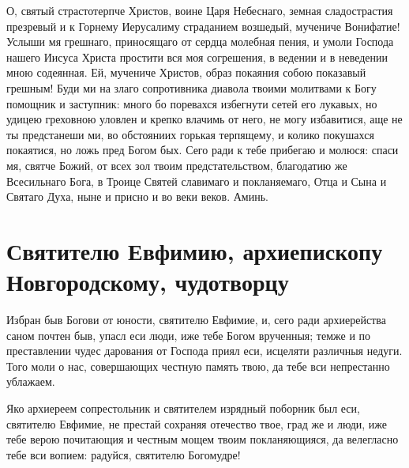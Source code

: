 О, святый страстотерпче Христов, воине Царя Небеснаго, земная сладострастия презревый и к Горнему Иерусалиму страданием возшедый, мучениче Вонифатие! Услыши мя грешнаго, приносящаго от сердца молебная пения, и умоли Господа нашего Иисуса Христа простити вся моя согрешения, в ведении и в неведении мною содеянная. Ей, мучениче Христов, образ покаяния собою показавый грешным! Буди ми на злаго сопротивника диавола твоими молитвами к Богу помощник и заступник: много бо поревахся избегнути сетей его лукавых, но удицею греховною уловлен и крепко влачимь от него, не могу избавитися, аще не ты предстанеши ми, во обстояниих горькая терпящему, и колико покушахся покаятися, но ложь пред Богом бых. Сего ради к тебе прибегаю и молюся: спаси мя, святче Божий, от всех зол твоим предстательством, благодатию же Всесильнаго Бога, в Троице Святей славимаго и покланяемаго, Отца и Сына и Святаго Духа, ныне и присно и во веки веков. Аминь. 
\mychapterending


 

\section{Святителю Евфимию, архиепископу Новгородскому, чудотворцу}
 




Избран быв Богови от юности, святителю Евфимие, и, сего ради архиерейства саном почтен быв, упасл еси люди, иже тебе Богом врученныя; темже и по преставлении чудес дарования от Господа приял еси, исцеляти различныя недуги. Того моли о нас, совершающих честную память твою, да тебе вси непрестанно ублажаем.




Яко архиереем сопрестольник и святителем изрядный поборник был еси, святителю Евфимие, не престай сохраняя отечество твое, град же и люди, иже тебе верою почитающия и честным мощем твоим покланяющияся, да велегласно тебе вси вопием: радуйся, святителю Богомудре!




